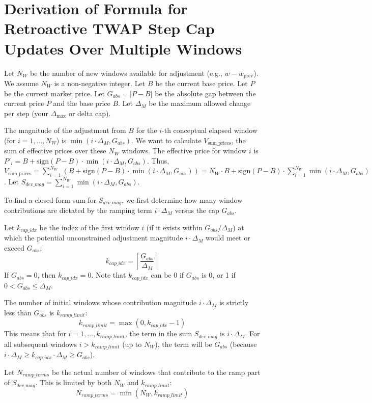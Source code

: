 \documentclass{article}
\begin{document}
\section*{Derivation of Formula for Retroactive TWAP Step Cap Updates Over Multiple Windows}

Let $N_W$ be the number of new windows available for adjustment (e.g., $w - w_{\text{prev}}$). We assume $N_W$ is a non-negative integer.
Let $B$ be the current base price.
Let $P$ be the current market price.
Let $G_{abs} = |P - B|$ be the absolute gap between the current price $P$ and the base price $B$.
Let $\Delta_M$ be the maximum allowed change per step (your $\Delta_{\max}$ or delta cap).

The magnitude of the adjustment from $B$ for the $i$-th conceptual elapsed window (for $i=1, \dots, N_W$) is $\min(i \cdot \Delta_M, G_{abs})$.
We want to calculate $V_{\text{sum\_prices}}$, the sum of effective prices over these $N_W$ windows. The effective price for window $i$ is $P'_i = B + \text{sign}(P-B) \cdot \min(i \cdot \Delta_M, G_{abs})$.
Thus, $V_{\text{sum\_prices}} = \sum_{i=1}^{N_W} (B + \text{sign}(P-B) \cdot \min(i \cdot \Delta_M, G_{abs})) = N_W \cdot B + \text{sign}(P-B) \cdot \sum_{i=1}^{N_W} \min(i \cdot \Delta_M, G_{abs})$.
Let $S_{dev\_mag} = \sum_{i=1}^{N_W} \min(i \cdot \Delta_M, G_{abs})$.

To find a closed-form sum for $S_{dev\_mag}$, we first determine how many window contributions are dictated by the ramping term $i \cdot \Delta_M$ versus the cap $G_{abs}$.

Let $k_{cap\_idx}$ be the index of the first window $i$ (if it exists within $G_{abs}/\Delta_M$) at which the potential unconstrained adjustment magnitude $i \cdot \Delta_M$ would meet or exceed $G_{abs}$:
\[ k_{cap\_idx} = \left\lceil \frac{G_{abs}}{\Delta_M} \right\rceil \]
If $G_{abs} = 0$, then $k_{cap\_idx} = 0$. Note that $k_{cap\_idx}$ can be 0 if $G_{abs}$ is 0, or 1 if $0 < G_{abs} \le \Delta_M$.

The number of initial windows whose contribution magnitude $i \cdot \Delta_M$ is strictly less than $G_{abs}$ is $k_{ramp\_limit}$:
\[ k_{ramp\_limit} = \max(0, k_{cap\_idx} - 1) \]
This means that for $i=1, \dots, k_{ramp\_limit}$, the term in the sum $S_{dev\_mag}$ is $i \cdot \Delta_M$. For all subsequent windows $i > k_{ramp\_limit}$ (up to $N_W$), the term will be $G_{abs}$ (because $i \cdot \Delta_M \ge k_{cap\_idx} \cdot \Delta_M \ge G_{abs}$).

Let $N_{ramp\_terms}$ be the actual number of windows that contribute to the ramp part of $S_{dev\_mag}$. This is limited by both $N_W$ and $k_{ramp\_limit}$:
\[ N_{ramp\_terms} = \min(N_W, k_{ramp\_limit}) \]
\end{document}
